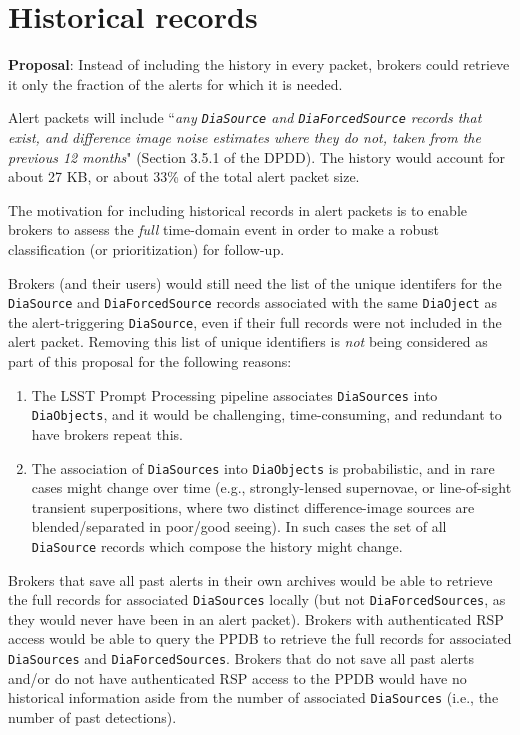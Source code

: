 \documentclass[DM,authoryear,toc]{lsstdoc}
\begin{document}
\section{Historical records}\label{sec:histories}

\textbf{Proposal}: Instead of including the history in every packet, brokers could retrieve it only the fraction 
of the alerts for which it is needed.

Alert packets will include ``\textit{any \texttt{DiaSource} and \texttt{DiaForcedSource} records that exist, and difference image noise
estimates where they do not, taken from the previous 12 months}" (Section 3.5.1 of the DPDD).
The history would account for about 27 KB, or about 33\% of the total alert packet size.

The motivation for including historical records in alert packets is to enable brokers to assess the \emph{full} 
time-domain event in order to make a robust classification (or prioritization) for follow-up.

Brokers (and their users) would still need the list of the unique identifers for the \texttt{DiaSource} and \texttt{DiaForcedSource} 
records associated with the same \texttt{DiaOject} as the alert-triggering \texttt{DiaSource}, even if their full records were not included 
in the alert packet.
Removing this list of unique identifiers is \emph{not} being considered as part of this proposal for the following reasons:

\begin{enumerate}
\item The LSST Prompt Processing pipeline associates \texttt{DiaSources} into \texttt{DiaObjects}, and it would be challenging, time-consuming, 
and redundant to have brokers repeat this.
\item The association of \texttt{DiaSources} into \texttt{DiaObjects} is probabilistic, and in rare cases might change over time 
(e.g., strongly-lensed supernovae, or line-of-sight transient superpositions, where two distinct difference-image sources are 
blended/separated in poor/good seeing).
In such cases the set of all \texttt{DiaSource} records which compose the history might change.
\end{enumerate}

Brokers that save all past alerts in their own archives would be able to retrieve the full records for associated \texttt{DiaSources} 
locally (but not \texttt{DiaForcedSources}, as they would never have been in an alert packet).
Brokers with authenticated RSP access would be able to query the PPDB to retrieve the full records for associated \texttt{DiaSources} 
and \texttt{DiaForcedSources}.
Brokers that do not save all past alerts and/or do not have authenticated RSP access to the PPDB would have no historical 
information aside from the number of associated \texttt{DiaSources} (i.e., the number of past detections).
\end{document}
